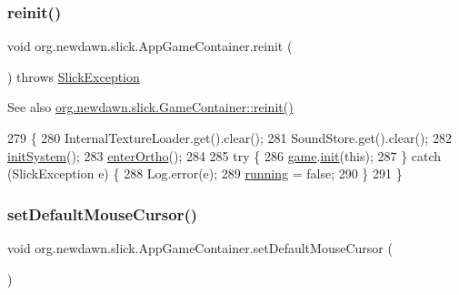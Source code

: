 \subsubsection{\texorpdfstring{reinit()}{reinit()}}
{\footnotesize\ttfamily void org.\+newdawn.\+slick.\+App\+Game\+Container.\+reinit (\begin{DoxyParamCaption}{ }\end{DoxyParamCaption}) throws \mbox{\hyperlink{classorg_1_1newdawn_1_1slick_1_1_slick_exception}{Slick\+Exception}}\hspace{0.3cm}{\ttfamily [inline]}}

\begin{DoxySeeAlso}{See also}
\mbox{\hyperlink{classorg_1_1newdawn_1_1slick_1_1_game_container_ac7f96cd2a8598d125a7ba4ce6c1e2b6a}{org.\+newdawn.\+slick.\+Game\+Container\+::reinit()}} 
\end{DoxySeeAlso}

\begin{DoxyCode}
279                                                \{
280         InternalTextureLoader.get().clear();
281         SoundStore.get().clear();
282         \mbox{\hyperlink{classorg_1_1newdawn_1_1slick_1_1_game_container_a6fee625fa386e0ef5a99b6f4bcc3f147}{initSystem}}();
283         \mbox{\hyperlink{classorg_1_1newdawn_1_1slick_1_1_game_container_a1e8c835b781b018347f50dcf37bbb5c2}{enterOrtho}}();
284         
285         \textcolor{keywordflow}{try} \{
286             \mbox{\hyperlink{classorg_1_1newdawn_1_1slick_1_1_game_container_a6a38bb26e45e1c884940caf35c7cfcdc}{game}}.\mbox{\hyperlink{interfaceorg_1_1newdawn_1_1slick_1_1_game_ad2dd6affab08bb8fdb5fab0815957b7a}{init}}(\textcolor{keyword}{this});
287         \} \textcolor{keywordflow}{catch} (SlickException e) \{
288             Log.error(e);
289             \mbox{\hyperlink{classorg_1_1newdawn_1_1slick_1_1_game_container_a5cb10a093281abb5b6ee60f2b18c26c3}{running}} = \textcolor{keyword}{false};
290         \}
291     \}
\end{DoxyCode}
\mbox{\label{classorg_1_1newdawn_1_1slick_1_1_app_game_container_acfe3089f87d1952e61f3d2f1572ee5ee}} 
\subsubsection{\texorpdfstring{set\+Default\+Mouse\+Cursor()}{setDefaultMouseCursor()}}
{\footnotesize\ttfamily void org.\+newdawn.\+slick.\+App\+Game\+Container.\+set\+Default\+Mouse\+Cursor (\begin{DoxyParamCaption}{ }\end{DoxyParamCaption})\hspace{0.3cm}{\ttfamily [inline]}}

